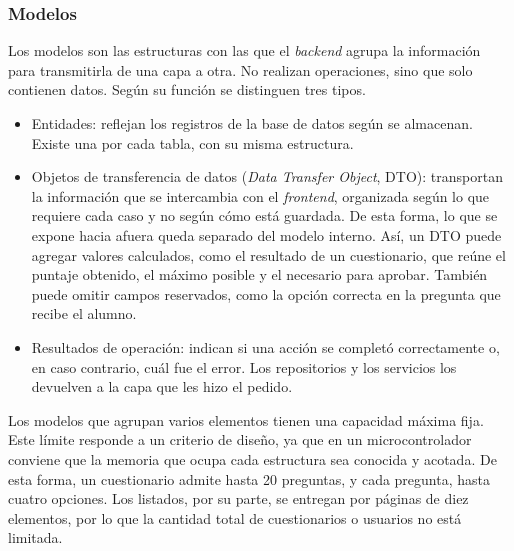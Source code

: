 \subsubsection{Modelos}

Los modelos son las estructuras con las que el \emph{backend} agrupa la información para transmitirla de una capa a otra. No realizan operaciones, sino que solo contienen datos. Según su función se distinguen tres tipos.

\begin{itemize}

\item Entidades: reflejan los registros de la base de datos según se almacenan. Existe una por cada tabla, con su misma estructura.

\item Objetos de transferencia de datos (\emph{Data Transfer Object}, DTO): transportan la información que se intercambia con el \emph{frontend}, organizada según lo que requiere cada caso y no según cómo está guardada. De esta forma, lo que se expone hacia afuera queda separado del modelo interno. Así, un DTO puede agregar valores calculados, como el resultado de un cuestionario, que reúne el puntaje obtenido, el máximo posible y el necesario para aprobar. También puede omitir campos reservados, como la opción correcta en la pregunta que recibe el alumno.

\item Resultados de operación: indican si una acción se completó correctamente o, en caso contrario, cuál fue el error. Los repositorios y los servicios los devuelven a la capa que les hizo el pedido.

\end{itemize}

Los modelos que agrupan varios elementos tienen una capacidad máxima fija. Este límite responde a un criterio de diseño, ya que en un microcontrolador conviene que la memoria que ocupa cada estructura sea conocida y acotada. De esta forma, un cuestionario admite hasta 20 preguntas, y cada pregunta, hasta cuatro opciones. Los listados, por su parte, se entregan por páginas de diez elementos, por lo que la cantidad total de cuestionarios o usuarios no está limitada.

